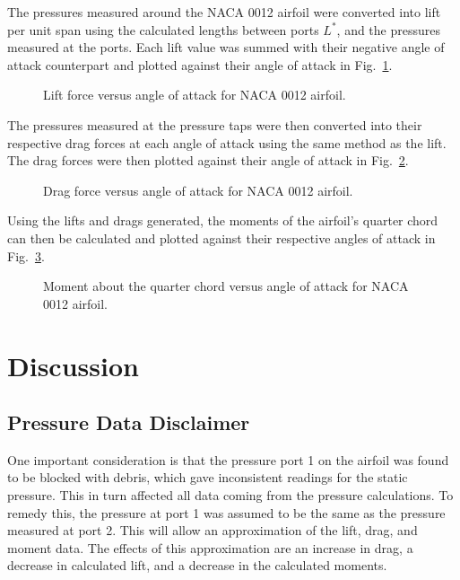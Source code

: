 \documentclass[journal,letterpaper]{IEEEtran}
\begin{document}
The pressures measured around the NACA 0012 airfoil were converted into lift per unit span using the calculated lengths between ports $L^*$, and the pressures measured at the ports.
Each lift value was summed with their negative angle of attack counterpart and plotted against their angle of attack in Fig.~\ref{fig:Lift}.

\begin{figure}[H]
    \centering
    
    \caption{Lift force versus angle of attack for NACA 0012 airfoil.}
    \label{fig:Lift}
\end{figure}

The pressures measured at the pressure taps were then converted into their respective drag forces at each angle of attack using the same method as the lift.
The drag forces were then plotted against their angle of attack in Fig.~\ref{fig:Drag}.

\begin{figure}[H]
    \centering
    
    \caption{Drag force versus angle of attack for NACA 0012 airfoil.}
    \label{fig:Drag}
\end{figure}

Using the lifts and drags generated, the moments of the airfoil's quarter chord can then be calculated and plotted against their respective angles of attack in Fig.~\ref{fig:Moment}.

\begin{figure}[H]
    \centering
    
    \caption{Moment about the quarter chord versus angle of attack for NACA 0012 airfoil.}
    \label{fig:Moment}
\end{figure}


\section{Discussion}

\subsection{Pressure Data Disclaimer}

One important consideration is that the pressure port 1 on the airfoil was found to be blocked with debris, which gave inconsistent readings for the static pressure.
This in turn affected all data coming from the pressure calculations.
To remedy this, the pressure at port 1 was assumed to be the same as the pressure measured at port 2.
This will allow an approximation of the lift, drag, and moment data.
The effects of this approximation are an increase in drag, a decrease in calculated lift, and a decrease in the calculated moments.
\end{document}
